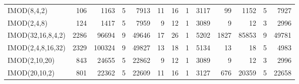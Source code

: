 \begin{table}[t]
{\begin{tabular}[t]{l|rrrr|rrrr|rrrr}
IMOD(8,4,2)	& 106	& 1163	& 5	& 7913	& 11	& 16	& 1	& 3117	& 99	& 1152	& 5	& 7927\\
IMOD(2,4,8)	& 124	& 1417	& 5	& 7959	& 9	& 12	& 1	& 3089	& 9	& 12	& 3	& 2996\\
IMOD(32,16,8,4,2)	& 2286	& 96694	& 9	& 49646	& 17	& 26	& 1	& 5202	& 1827	& 85853	& 9	& 49781\\
IMOD(2,4,8,16,32)	& 2329	& 100324	& 9	& 49827	& 13	& 18	& 1	& 5134	& 13	& 18	& 5	& 4983\\
IMOD(2,10,20)	& 843	& 24655	& 5	& 22862	& 9	& 12	& 1	& 3089	& 9	& 12	& 3	& 2996\\
IMOD(20,10,2)	& 801	& 22362	& 5	& 22609	& 11	& 16	& 1	& 3127	& 676	& 20359	& 5	& 22658\\
\end{tabular}}
\end{table}